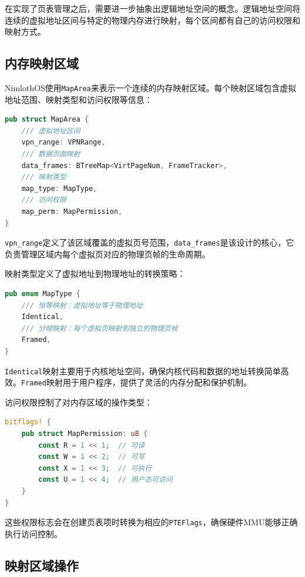 在实现了页表管理之后，需要进一步抽象出逻辑地址空间的概念。逻辑地址空间将连续的虚拟地址区间与特定的物理内存进行映射，每个区间都有自己的访问权限和映射方式。

\subsection{内存映射区域}

NimlothOS使用\lstinline[language=Rust]{MapArea}来表示一个连续的内存映射区域。每个映射区域包含虚拟地址范围、映射类型和访问权限等信息：

\begin{lstlisting}[language=Rust,caption={内存映射区域结构}, label={lst:map-area}]
pub struct MapArea {
    /// 虚拟地址区间
    vpn_range: VPNRange,
    /// 数据页面映射
    data_frames: BTreeMap<VirtPageNum, FrameTracker>,
    /// 映射类型
    map_type: MapType,
    /// 访问权限
    map_perm: MapPermission,
}
\end{lstlisting}

\lstinline[language=Rust]{vpn_range}定义了该区域覆盖的虚拟页号范围，\lstinline[language=Rust]{data_frames}是该设计的核心，它负责管理区域内每个虚拟页对应的物理页帧的生命周期。

映射类型定义了虚拟地址到物理地址的转换策略：

\begin{lstlisting}[language=Rust,caption={映射类型定义}, label={lst:map-type}]
pub enum MapType {
    /// 恒等映射：虚拟地址等于物理地址
    Identical,
    /// 分帧映射：每个虚拟页映射到独立的物理页帧
    Framed,
}
\end{lstlisting}

\lstinline[language=Rust]{Identical}映射主要用于内核地址空间，确保内核代码和数据的地址转换简单高效。\lstinline[language=Rust]{Framed}映射用于用户程序，提供了灵活的内存分配和保护机制。

访问权限控制了对内存区域的操作类型：

\begin{lstlisting}[language=Rust,caption={访问权限定义}, label={lst:map-permission}]
bitflags! {
    pub struct MapPermission: u8 {
        const R = 1 << 1;  // 可读
        const W = 1 << 2;  // 可写  
        const X = 1 << 3;  // 可执行
        const U = 1 << 4;  // 用户态可访问
    }
}
\end{lstlisting}

这些权限标志会在创建页表项时转换为相应的\lstinline[language=Rust]{PTEFlags}，确保硬件MMU能够正确执行访问控制。

\subsection{映射区域操作}

